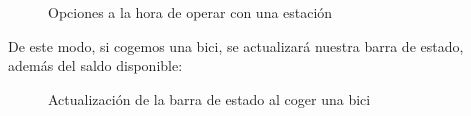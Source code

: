 \begin{figure} [!htb]
	\centering
	\caption{Opciones a la hora de operar con una estación}
	\label{fig:opcionesEstacion}
\end{figure}

De este modo, si cogemos una bici, se actualizará nuestra barra de estado, además del saldo disponible:

\begin{figure} [!htb]
	\centering
	\caption{Actualización de la barra de estado al coger una bici}
	\label{fig:barraEstadoBiciCogida}
\end{figure}


